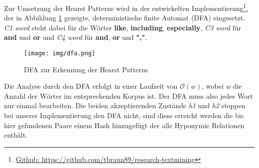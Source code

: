 %
Zur Umsetzung der Hearst Patterns wird in der entwickelten
Implementierung\footnote{\href{https://github.com/tbraun89/research-textmining}{Github:
 https://github.com/tbraun89/research-textmining}}, der in Abbildung
\ref{fig:dfa} gezeigte, deterministische finite Automat (DFA)
eingesetzt. \textit{C1 word} steht dabei für die Wörter
\textbf{like}, \textbf{including}, \textbf{especially}, \textit{C3
  word} für \textbf{and} und \textbf{or} und \textit{C4 word} für
\textbf{and}, \textbf{or} und \textbf{","}.%
%
\begin{figure}[h!] 
  \centering
  \texttt{[image: img/dfa.png]}
  \caption{DFA zur Erkennung der Hearst Patterns}
  \label{fig:dfa}
\end{figure}%
%
Die Analyse durch den DFA erfolgt in einer Laufzeit von
$\mathcal{O}(w)$, wobei \textit{w} die Anzahl der Wörter im
entsprechenden Korpus ist. Der DFA muss also jedes Wort nur einmal
bearbeiten. Die beiden akzeptierenden Zustände \textit{h1} und
\textit{h2} stoppen bei unserer Implementierung den DFA nicht, sind
diese erreicht werden die bis hier gefundenen Paare einem Hash
hinzugefügt der alle Hyponymie Relationen enthält.
